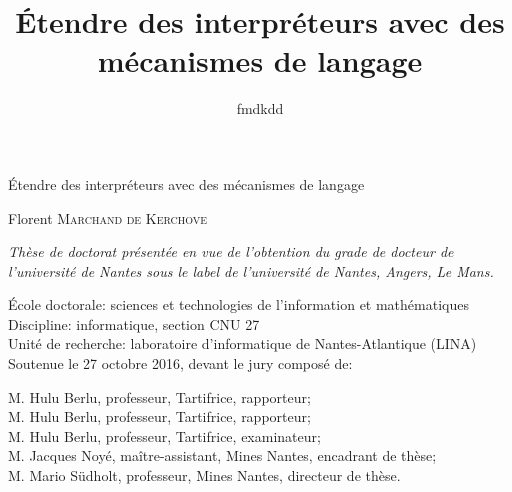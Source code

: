 

\newcommand{\titlefr}{Étendre des interpréteurs avec des mécanismes de langage}
\newcommand{\titleen}{Extending interpreters with language mechanisms}

\title{\titlefr}
\author{fmdkdd}




\frontmatter

\begin{titlepage}
\sffamily
\vspace{6cm}

\begin{raggedright}
\Huge\titlefr
\end{raggedright}

\vspace{1.5cm}

\LARGE
\noindent
Florent \textsc{Marchand de Kerchove}

\vfill

\begin{raggedright}
\rmfamily\normalsize
\itshape
Thèse de doctorat présentée en vue de l'obtention du
grade de docteur de l'université de Nantes
sous le label de l'université de Nantes, Angers, Le Mans.

\vspace{1em}
École doctorale: sciences et technologies de l'information et mathématiques\\
Discipline: informatique, section CNU 27\\
Unité de recherche: laboratoire d'informatique de Nantes-Atlantique (LINA)\\

\vspace{1em}
Soutenue le 27 octobre 2016, devant le jury composé de:

\vspace{0.5em}
M. Hulu Berlu, professeur, Tartifrice, rapporteur;\\
M. Hulu Berlu, professeur, Tartifrice, rapporteur;\\
M. Hulu Berlu, professeur, Tartifrice, examinateur;\\
M. Jacques Noyé, maître-assistant, Mines Nantes, encadrant de thèse;\\
M. Mario Südholt, professeur, Mines Nantes, directeur de thèse.\\
\vspace{-2cm}
\end{raggedright}
\end{titlepage}

